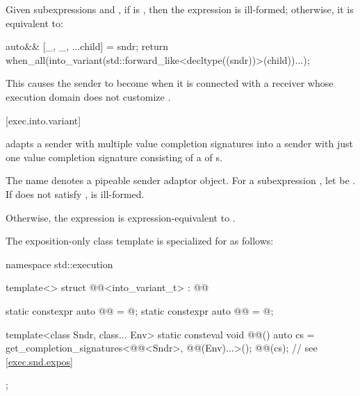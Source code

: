 \pnum
Given subexpressions  and ,
if
is ,
then the expression 
is ill-formed;
otherwise, it is equivalent to:
\begin{codeblock}
auto&& [_, _, ...child] = sndr;
return when_all(into_variant(std::forward_like<decltype((sndr))>(child))...);
\end{codeblock}
\begin{note}
This causes the  sender
to become 
when it is connected with a receiver
whose execution domain does not customize .
\end{note}

[exec.into.variant]{}

\pnum
{} adapts a sender with multiple value completion signatures
into a sender with just one value completion signature
consisting of a  of s.

\pnum
The name  denotes a pipeable sender adaptor object.
For a subexpression , let  be .
If  does not satisfy ,
 is ill-formed.

\pnum
Otherwise, the expression 
is expression-equivalent to
.

\pnum
The exposition-only class template 
is specialized for  as follows:
\begin{codeblock}
namespace std::execution {
  template<>
  struct @@<into_variant_t> : @@ {
    static constexpr auto @@ = @\seebelow@;
    static constexpr auto @@ = @\seebelow@;

    template<class Sndr, class... Env>
      static consteval void @@() {
        auto cs = get_completion_signatures<@@<Sndr>, @@(Env)...>();
        @@(cs);   // see \ref{exec.snd.expos}
      }
  };
}
\end{codeblock}

